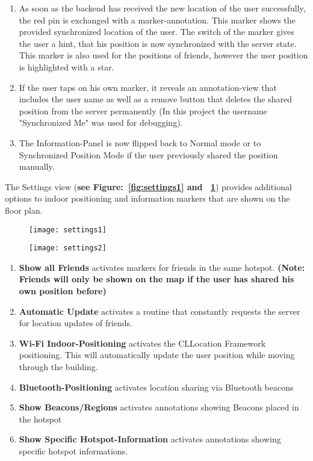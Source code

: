 \begin{enumerate}
\item As soon as the backend has received the new location of the user successfully, the red pin is exchanged with a marker-annotation. This marker shows the provided synchronized location of the user. The switch of the marker gives the user a hint, that his position is now synchronized with the server state. This marker is also used for the positions of friends, however the user position is highlighted with a star.
\item If the user taps on his own marker, it reveals an annotation-view that includes the user name as well as a remove button that deletes the shared position from the server permanently (In this project the username "Synchronized Me" was used for debugging).

\item The Information-Panel is now flipped back to Normal mode or to Synchronized Position Mode if the user previously shared the position manually.
\end{enumerate}


The Settings view (\textbf{see Figure:~\ref{fig:settings1} and ~\ref{fig:settings2}}) provides additional options to indoor positioning and information markers that are shown on the floor plan.

\begin{figure}
\centering
\begin{minipage}{.5\textwidth}
  \centering
  \texttt{[image: settings1]}
  \label{fig:settings1}
\end{minipage}%
\begin{minipage}{.5\textwidth}
  \centering
  \texttt{[image: settings2]}
  \label{fig:settings2}
\end{minipage}
\end{figure}

\begin{enumerate}
\item \textbf{Show all Friends} activates markers for friends in the same hotspot. \textbf{(Note: Friends will only be shown on the map if the user has shared his own position before)}
\item \textbf{Automatic Update} activates a routine that constantly requests the server for location updates of friends.
\item \textbf{Wi-Fi Indoor-Positioning} activates the CLLocation Framework positioning. This will automatically update the user position while moving through the building.
\item \textbf{Bluetooth-Positioning} activates location sharing via Bluetooth beacons
\item \textbf{Show Beacons/Regions} activates annotations showing Beacons placed in the hotspot
\item \textbf{Show Specific Hotspot-Information} activates annotations showing specific hotspot informations.
\end{enumerate}


